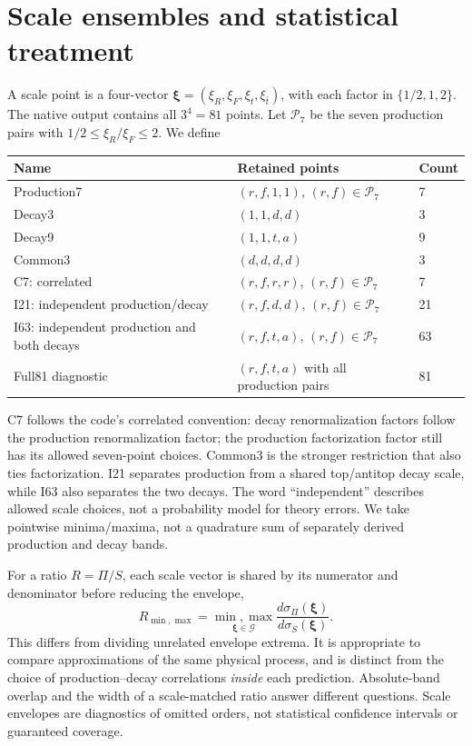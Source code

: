 \documentclass[11pt,a4paper]{article}
\begin{document}
\section{Scale ensembles and statistical treatment}
A scale point is a four-vector
$\boldsymbol\xi=(\xi_R,\xi_F,\xi_t,\xi_{\bar t})$, with each factor in
$\{1/2,1,2\}$. The native output contains all $3^4=81$ points. Let
$\mathcal P_7$ be the seven production pairs with
$1/2\leq\xi_R/\xi_F\leq2$. We define
\begin{center}\small
\begin{tabular}{lll}
\toprule Name & Retained points & Count\\ \midrule
Production7 & $(r,f,1,1)$, $(r,f)\in\mathcal P_7$ & 7\\
Decay3 & $(1,1,d,d)$ & 3\\
Decay9 & $(1,1,t,a)$ & 9\\
Common3 & $(d,d,d,d)$ & 3\\
C7: correlated & $(r,f,r,r)$, $(r,f)\in\mathcal P_7$ & 7\\
I21: independent production/decay & $(r,f,d,d)$, $(r,f)\in\mathcal P_7$ & 21\\
I63: independent production and both decays & $(r,f,t,a)$, $(r,f)\in\mathcal P_7$ & 63\\
Full81 diagnostic & $(r,f,t,a)$ with all production pairs & 81\\
\bottomrule
\end{tabular}\end{center}
C7 follows the code's correlated convention: decay renormalization factors
follow the production renormalization factor; the production factorization
factor still has its allowed seven-point choices. Common3 is the stronger
restriction that also ties factorization. I21 separates production from a
shared top/antitop decay scale, while I63 also separates the two decays.
The word ``independent'' describes allowed scale choices, not a probability
model for theory errors. We take pointwise minima/maxima, not a quadrature
sum of separately derived production and decay bands.

For a ratio $R=\Pi/S$, each scale vector is shared by its numerator and
denominator before reducing the envelope,
\begin{equation}
 R_{\min,\max}=\underset{\boldsymbol\xi\in\mathcal G}{\min,\max}
 \frac{d\sigma_\Pi(\boldsymbol\xi)}{d\sigma_S(\boldsymbol\xi)}.
\end{equation}
This differs from dividing unrelated envelope extrema. It is appropriate
to compare approximations of the same physical process, and is distinct
from the choice of production--decay correlations \emph{inside} each
prediction. Absolute-band overlap and the width of a scale-matched ratio
answer different questions. Scale envelopes are diagnostics of omitted
orders, not statistical confidence intervals or guaranteed coverage.
\end{document}
